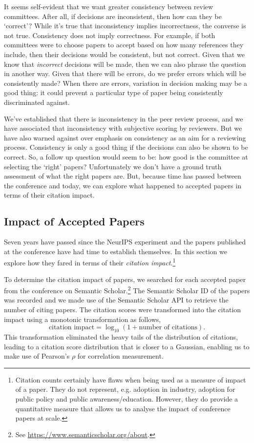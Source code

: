 \documentclass[twoside]{article}
\begin{document}
It seems self-evident that we want greater consistency between review committees. After all, if decisions are inconsistent, then how can they be `correct'? While it's true that inconsistency implies incorrectness, the converse is not true. Consistency does not imply correctness. For example, if both committees were to choose papers to accept based on how many references they include, then their decisions would be consistent, but not correct. Given that we know that \emph{incorrect} decisions will be made, then we can also phrase the question in another way. Given that there will be errors, do we prefer errors which will be consistently made? When there are errors, variation in decision making may be a good thing: it could prevent a particular type of paper being consistently discriminated against.

We've established that there is inconsistency in the peer review process, and we have associated that inconsistency with subjective scoring by reviewers. But we have also warned against over emphasis on consistency as an aim for a reviewing process. Consistency is only a good thing if the decisions can also be shown to be correct. So, a follow up question would seem to be: how good is the committee at selecting the `right' papers? Unfortunately we don't have a ground truth assessment of what the right papers are. But, because time has passed between the conference and today, we can explore what happened to accepted papers in terms of their citation impact. 

\subsection{Impact of Accepted Papers}

Seven years have passed since the NeurIPS experiment and the papers published at the conference have had time to establish themselves. In this section we explore how they fared in terms of their \emph{citation impact}.\footnote{Citation counts certainly have flaws when being used as a measure of impact of a paper. They do not represent, e.g. adoption in industry, adoption for public policy and public awareness/education. However, they do provide a quantitative measure that allows us to analyse the impact of conference papers at scale.}

To determine the citation impact of papers, we searched for each accepted paper from the conference on Semantic Scholar.\footnote{See \href{https://www.semanticscholar.org/about}{https://www.semanticscholar.org/about}.} The Semantic Scholar ID of the papers was recorded and we made use of the Semantic Scholar API to retrieve the number of citing papers. The citation scores were transformed into the citation impact using a monotonic transformation as follows,
$$
\text{citation impact} = \log_{10} (1 + \text{number of citations}).
$$
This transformation eliminated the heavy tails of the distribution of citations, leading to a citation score distribution that is closer to a Gaussian, enabling us to make use of Pearson's $\rho$ for correlation measurement.
\end{document}
